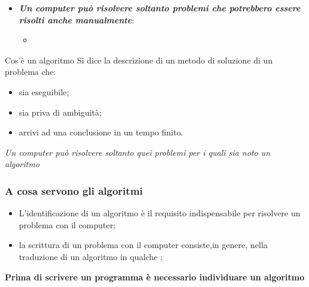 \begin{frame}
\begin{block}{}
\begin{itemize}
\item \textbf{\textit{Un computer può risolvere soltanto problemi che potrebbero essere risolti anche manualmente}}:
\begin{itemize}
\item {}
\end{itemize}
\end{itemize}
\end{block}
\pause
\begin{block}{Cos'è un algoritmo}
Si dice  la \alert{descrizione} di un metodo di soluzione di un problema che:
\begin{itemize}
\item sia eseguibile;
\item sia priva di ambiguità;
\item arrivi ad una conclusione in un tempo finito.
\end{itemize}
\end{block}
\pause
\begin{block}{}
\textit{Un computer può risolvere soltanto quei problemi per i quali sia noto un algoritmo}
\end{block}
\end{frame}

\begin{frame}
\frametitle{A cosa servono gli algoritmi}
\begin{block}{}
\begin{itemize}
\item L'identificazione di un algoritmo è il requisito indispensabile per risolvere un problema con il computer;
\item la scrittura di un problema con il computer consiste,in genere, nella traduzione di un algoritmo in qualche
;
\end{itemize}
\end{block}
\pause
\begin{block}{}
\begin{center}
\large{\textbf{Prima di scrivere un programma è necessario individuare un algoritmo}}
\end{center}
\end{block}
\end{frame}

